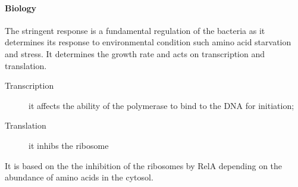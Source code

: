 \paragraph{Biology} The stringent response is a fundamental regulation of the bacteria as it determines its response to environmental condition such amino acid starvation and stress. It determines the growth rate and acts on transcription and translation.

 \begin{description}
   \item[Transcription] it affects the ability of the polymerase to bind to the DNA for initiation;
   \item[Translation] it inhibs the ribosome  
 \end{description}
 It is based on the the inhibition of the ribosomes by RelA depending on the abundance of amino acids in the cytosol.